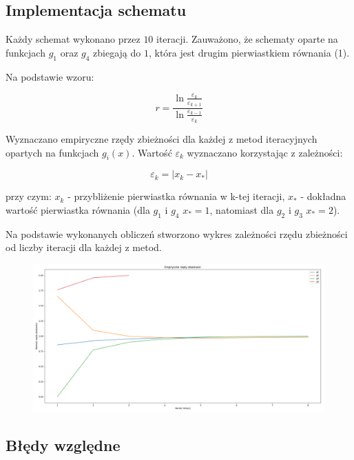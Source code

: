 \documentclass{article}
\begin{document}
	\subsection*{Implementacja schematu}

	Każdy schemat wykonano przez $10$ iteracji. Zauważono, że schematy oparte na funkcjach $g_1$ oraz $g_4$ zbiegają do $1$, która jest drugim pierwiastkiem równania (1). 

	Na podstawie wzoru:

	\begin{equation}
		r = \frac{\ln \frac{\varepsilon_k}{\varepsilon_{k+1}}}{\ln \frac{\varepsilon_{k-1}}{\varepsilon_k}}
	\end{equation}

	Wyznaczano empiryczne rzędy zbieżności dla każdej z metod iteracyjnych opartych na funkcjach $g_i(x)$. Wartość $\varepsilon_k$ wyznaczano korzystając z zależności:

	\begin{equation}
		\varepsilon_k = |x_k - x_*|
	\end{equation}

	przy czym: $x_k$ - przybliżenie pierwiastka równania w k-tej iteracji, $x_*$ - dokładna wartość pierwiastka równania (dla $g_1$ i $g_4$ $x_* = 1$, natomiast dla $g_2$ i $g_3$ $x_* = 2$).

	Na podstawie wykonanych obliczeń stworzono wykres zależności rzędu zbieżności od liczby iteracji dla każdej z metod.

	\begin{figure}[h]
		\centering
		\includegraphics[scale = 0.3]{wykres1.png}
	\end{figure}


	\newpage

	\subsection*{Błędy względne}
\end{document}

